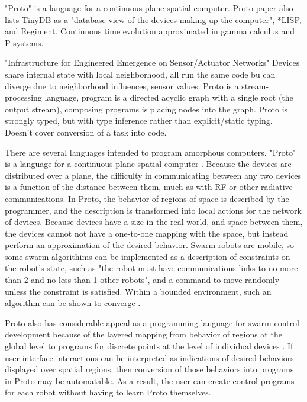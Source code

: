 \documentclass[]{article}
\begin{document}
"Proto" is a language for a continuous plane spatial computer. Proto paper also lists TinyDB as a "database view of the devices making up the computer", *LISP, and Regiment. Continuous time evolution approximated in gamma calculus and P-systems. 

"Infrastructure for Engineered Emergence on Sensor/Actuator Networks" \cite{beal2006infrastructure} Devices share internal state with local neighborhood, all run the same code bu can diverge due to neighborhood influences, sensor values. Proto is a stream-processing language, program is a directed acyclic graph with a single root (the output stream), composing programs is placing nodes into the graph. Proto is strongly typed, but with type inference rather than explicit/static typing. Doesn't cover conversion of a task into code. 

There are several languages intended to program amorphous computers. 
"Proto" is a language for a continuous plane spatial computer \cite{correll2009ad}.
Because the devices are distributed over a plane, the difficulty in communicating between any two devices is a function of the distance between them, much as with RF or other radiative communications.
In Proto, the behavior of regions of space is described by the programmer, and the description is transformed into local actions for the network of devices. 
Because devices have a size in the real world, and space between them, the devices cannot not have a one-to-one mapping with the space, but instead perform an approximation of the desired behavior. 
Swarm robots are mobile, so some swarm algorithims can be implemented as a description of constraints on the robot's state, such as "the robot must have communications links to no more than 2 and no less than 1 other robots", and a command to move randomly unless the constraint is satisfied. 
Within a bounded environment, such an algorithm can be shown to converge \cite{correll2009ad}. 

Proto also has considerable appeal as a programming language for swarm control development because of the layered mapping from behavior of regions at the global level to programs for discrete points at the level of individual devices \cite{beal2006infrastructure}. 
If user interface interactions can be interpreted as indications of desired behaviors displayed over spatial regions, then conversion of those behaviors into programs in Proto may be automatable. 
As a result, the user can create control programs for each robot without having to learn Proto themselves.  
\end{document}
